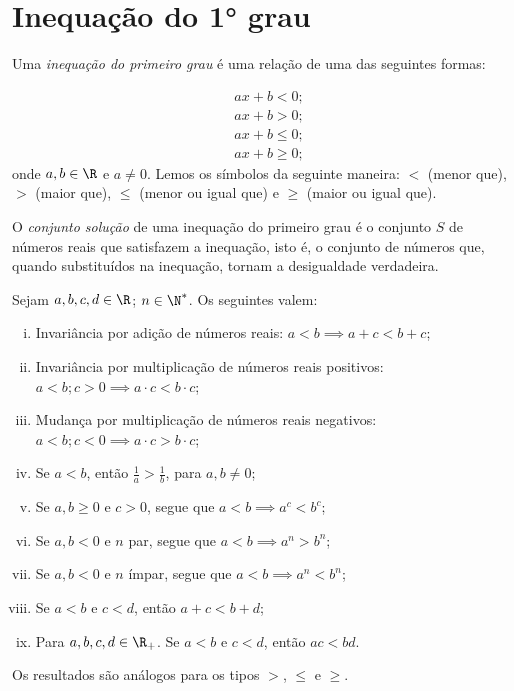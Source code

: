 \section{Inequação do 1° grau}

\begin{definition}
Uma \emph{inequação do primeiro grau} é uma relação de uma das seguintes formas:

\begin{align*}
& ax+b <0;\\
& ax+b >0;\\
& ax+b \le 0;\\
& ax+b \ge 0;
\end{align*}
%
onde $a, b \in \R$ e $ a \neq 0$. Lemos os símbolos da seguinte maneira: $<$ (menor que), $>$ (maior que), $\leq$ (menor ou igual
que) e $\geq$ (maior ou igual que).
\end{definition}

\begin{remark}
O \emph{conjunto solução} de uma inequação do primeiro grau é o conjunto $S$ de números reais que satisfazem a inequação, isto é, o conjunto de números que, quando substituídos na inequação, tornam a desigualdade verdadeira.
\end{remark}

\begin{proposition}
Sejam $a, b, c, d \in \R$; $n \in \N^*$. Os seguintes valem:
%
\begin{enumerate}[i.]
  \item Invariância por adição de números reais: $a < b \implies a+c < b+c$;
  \item Invariância por multiplicação de números reais positivos:
  $a < b ; c>0 \implies a \cdot c < b \cdot c$;
  \item Mudança por multiplicação de números reais
  negativos: $a < b ; c<0 \implies a \cdot c > b \cdot c$;
  \item Se $a < b$, então $\frac 1 a > \frac 1 b$, para $a, b \neq
  0$;
  \item Se $a,b \geq 0$ e $c>0$, segue que $a < b \implies a^c < b^c$;
  \item Se $a,b < 0$ e $n$ par, segue que $a < b \implies a^n > b^n$;
  \item Se $a,b < 0$ e $n$ ímpar, segue que $a < b \implies a^n <
  b^n$;
  \item Se $a< b$ e $c< d$, então $a+c < b+d$;
  \item Para $a, b, c, d \in \R_+$. Se $a< b$ e $c< d$, então $ac < bd$.
\end{enumerate}
%
Os resultados são análogos para os tipos $>$, $\leq$ e $\geq$.
\end{proposition}

